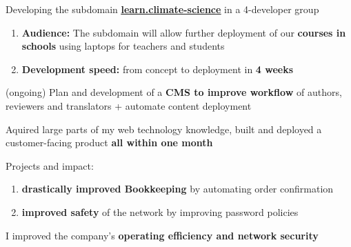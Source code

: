 \documentclass[]{jonas-cv}
\begin{document}
\begin{minipage}[t]{0.63\textwidth} 


\tinysectionsep

\sectionsep

\begin{tightemize}
    \item Developing the subdomain \href{https://learn.climate-science.com}{\textbf{\underline{learn.climate-science}}} in a 4-developer group
    \begin{enumerate}
        \item \textbf{Audience:} The subdomain will allow further deployment of our \textbf{courses in schools} using laptops for teachers and students
        \item \textbf{Development speed:} from concept to deployment in \textbf{4 weeks}
    \end{enumerate}
    \item (ongoing) Plan and development of a \textbf{CMS to improve workflow} of authors, reviewers and translators + automate content deployment
    \item [\faicon{angle-double-right}] Aquired large parts of my web technology knowledge, built and deployed a customer-facing product \textbf{all within one month}
\end{tightemize}
\largesectionsep



\begin{tightemize}
    \item Projects and impact:
    \begin{enumerate}
        \item \textbf{drastically improved Bookkeeping} by automating order confirmation
        \item \textbf{improved safety} of the network by improving password policies
    \end{enumerate}
    \item [\faicon{angle-double-right}] I improved the company's \textbf{operating efficiency and network security}
\end{tightemize}
\largesectionsep


\end{minipage}
\end{document}
